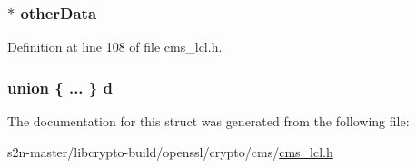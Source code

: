 \subsubsection[{\texorpdfstring{other\+Data}{otherData}}]{$\ast$ other\+Data}\hypertarget{struct_c_m_s___content_info__st_a6db5a19f806da6adf5dd6c8b644dbe9c}{}\label{struct_c_m_s___content_info__st_a6db5a19f806da6adf5dd6c8b644dbe9c}


Definition at line 108 of file cms\+\_\+lcl.\+h.

\subsubsection[{\texorpdfstring{d}{d}}]{\setlength{\rightskip}{0pt plus 5cm}union \{ ... \}   d}\hypertarget{struct_c_m_s___content_info__st_ae08e8227121de9ba2fb45f0e05e53ef1}{}\label{struct_c_m_s___content_info__st_ae08e8227121de9ba2fb45f0e05e53ef1}


The documentation for this struct was generated from the following file\+:\begin{DoxyCompactItemize}
\item 
s2n-\/master/libcrypto-\/build/openssl/crypto/cms/\hyperlink{cms__lcl_8h}{cms\+\_\+lcl.\+h}\end{DoxyCompactItemize}
